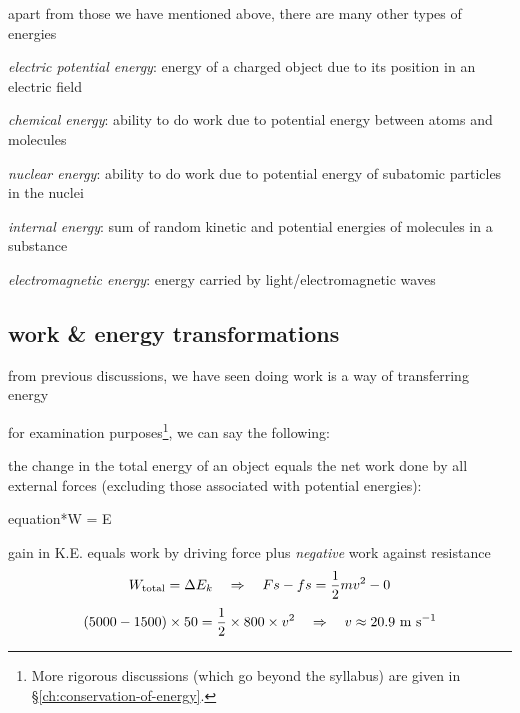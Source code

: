 apart from those we have mentioned above, there are many other types of energies 

\emph{electric potential energy}: energy of a charged object due to its position in an electric field

\titem \emph{chemical energy}: ability to do work due to potential energy between atoms and molecules

\titem \emph{nuclear energy}: ability to do work due to potential energy of subatomic particles in the nuclei

\titem \emph{internal energy}: sum of random kinetic and potential energies of molecules in a substance

\titem \emph{electromagnetic energy}: energy carried by light/electromagnetic waves


\subsection{work \& energy transformations}

from previous discussions, we have seen doing work is a way of transferring energy

for examination purposes\footnote{More rigorous discussions (which go beyond the syllabus) are given in \S\ref{ch:conservation-of-energy}.}, we can say the following:

\begin{ilight}
	the change in the total energy of an object equals the net work done by all external forces (excluding those associated with potential energies): \begin{empheq}[box=\tcbhighmath]{equation*}{W  = \Delta E} \end{empheq}
\end{ilight}


\begin{soln} gain in K.E. equals work by driving force plus \emph{negative} work against resistance
\begin{equation*}
W_\text{total} = \Delta E_k \quad \Rightarrow \quad Fs - fs = \frac{1}{2}mv^2 - 0
\end{equation*}
\begin{equation*}
(5000 - 1500)\times50 = \frac{1}{2}\times800\times v^2 \quad \Rightarrow \quad v\approx20.9\text{ m s$^{-1}$} 
\end{equation*}
\end{soln}

